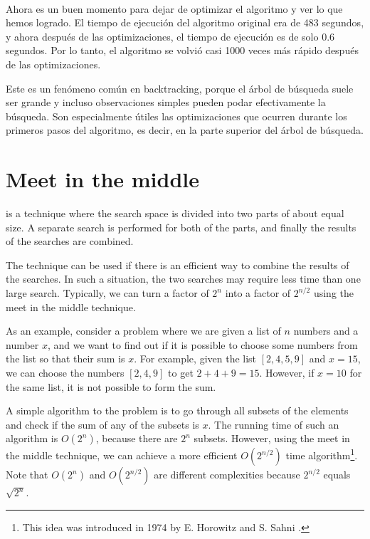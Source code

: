 ~\\
Ahora es un buen momento para dejar de optimizar
el algoritmo y ver lo que hemos logrado.
El tiempo de ejecución del algoritmo original
era de 483 segundos,
y ahora después de las optimizaciones,
el tiempo de ejecución es de solo 0.6 segundos.
Por lo tanto, el algoritmo se volvió casi 1000 veces
más rápido después de las optimizaciones.

Este es un fenómeno común en backtracking,
porque el árbol de búsqueda suele ser grande
y incluso observaciones simples pueden podar efectivamente
la búsqueda.
Son especialmente útiles las optimizaciones que
ocurren durante los primeros pasos del algoritmo,
es decir, en la parte superior del árbol de búsqueda.

\section{Meet in the middle}


 is a technique
where the search space is divided into
two parts of about equal size.
A separate search is performed
for both of the parts,
and finally the results of the searches are combined.

The technique can be used
if there is an efficient way to combine the
results of the searches.
In such a situation, the two searches may require less
time than one large search.
Typically, we can turn a factor of $2^n$
into a factor of $2^{n/2}$ using the meet in the
middle technique.

As an example, consider a problem where
we are given a list of $n$ numbers and
a number $x$,
and we want to find out if it is possible
to choose some numbers from the list so that
their sum is $x$.
For example, given the list $[2,4,5,9]$ and $x=15$,
we can choose the numbers $[2,4,9]$ to get $2+4+9=15$.
However, if $x=10$ for the same list,
it is not possible to form the sum.

A simple algorithm to the problem is to
go through all subsets of the elements and
check if the sum of any of the subsets is $x$.
The running time of such an algorithm is $O(2^n)$,
because there are $2^n$ subsets.
However, using the meet in the middle technique,
we can achieve a more efficient $O(2^{n/2})$ time algorithm\footnote{This
idea was introduced in 1974 by E. Horowitz and S. Sahni \cite{hor74}.}.
Note that $O(2^n)$ and $O(2^{n/2})$ are different
complexities because $2^{n/2}$ equals $\sqrt{2^n}$.

